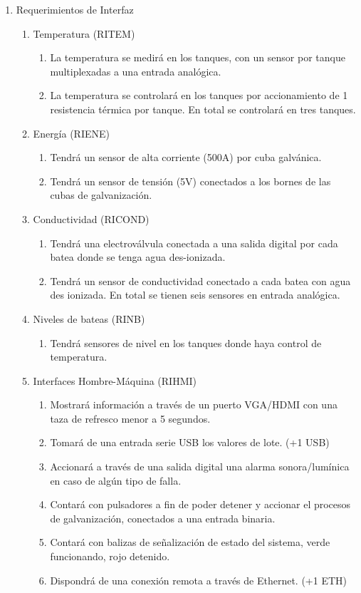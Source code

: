 \begin{enumerate}
\begin{enumerate}
\end{enumerate}

\item Requerimientos de Interfaz
\begin{enumerate}

\item Temperatura (RITEM)
\begin{enumerate}
\item La temperatura se medirá en los tanques, con un sensor por tanque multiplexadas a una entrada analógica.
\item La temperatura se controlará en los tanques por accionamiento de 1 resistencia térmica por tanque. En total se controlará en tres tanques.
\end{enumerate}

\item Energía (RIENE)
\begin{enumerate}
\item Tendrá un sensor de alta corriente (500A) por cuba galvánica.
\item Tendrá un sensor de tensión (5V) conectados a los bornes de las cubas de galvanización.
\end{enumerate}

\item Conductividad (RICOND)
\begin{enumerate}
\item Tendrá una electroválvula conectada a una salida digital por cada batea donde se tenga agua des-ionizada. 
\item Tendrá un sensor de conductividad conectado a cada batea con agua des ionizada. En total se tienen seis sensores en entrada analógica. 
\end{enumerate}

\item Niveles de bateas (RINB)
\begin{enumerate}
\item Tendrá sensores de nivel en los tanques donde haya control de temperatura. 
\end{enumerate}

\item Interfaces Hombre-Máquina (RIHMI)
\begin{enumerate}
\item Mostrará información a través de un puerto VGA/HDMI con una taza de refresco menor a 5 segundos.
\item Tomará de una entrada serie USB los valores de lote. (+1 USB)
\item Accionará a través de una salida digital una alarma sonora/lumínica en caso de algún tipo de falla. 
\item Contará con pulsadores a fin de poder detener y accionar el procesos de galvanización, conectados a una entrada binaria.
\item Contará con balizas de señalización de estado del sistema, verde funcionando, rojo detenido. 
\item Dispondrá de una conexión remota a través de Ethernet. (+1 ETH)
\end{enumerate}


\end{enumerate}
\end{enumerate}
